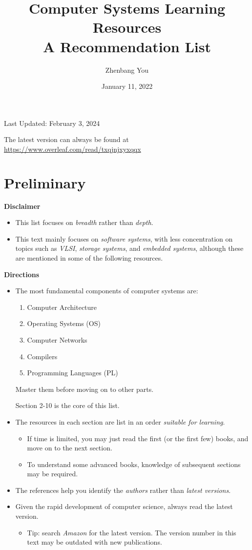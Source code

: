 \documentclass{article}
\title{\Huge{Computer Systems Learning Resources}\\ \huge{A Recommendation List}}
\author{Zhenbang You}
\date{January 11, 2022}
\begin{document}
\maketitle

\centerline{\large{Last Updated: February 3, 2024}}

\vspace{20pt}

The latest version can always be found at \href{https://www.overleaf.com/read/txqjnjxyxqqx}{https://www.overleaf.com/read/txqjnjxyxqqx}

\section{Preliminary}

\textbf{Disclaimer}
\begin{itemize}
    \item This list focuses on \emph{breadth} rather than \emph{depth}.
    \item This text mainly focuses on \emph{software systems}, with less concentration on topics such as \emph{VLSI}, \emph{storage systems}, and \emph{embedded systems}, although these are mentioned in some of the following resources.
\end{itemize}

\noindent
\textbf{Directions}
\begin{itemize}
    \item The most fundamental components of computer systems are:
    \begin{enumerate}
        \item Computer Architecture
        \item Operating Systems (OS)
        \item Computer Networks
        \item Compilers
        \item Programming Languages (PL)
    \end{enumerate}
    Master them before moving on to other parts.
    
    Section 2-10 is the core of this list.
    \item The resources in each section are list in an order \emph{suitable for learning}.
    \begin{itemize}
        \item If time is limited, you may just read the first (or the first few) books, and move on to the next section.
        \item To understand some advanced books, knowledge of subsequent sections may be required.
    \end{itemize}
    \item The references help you identify the \emph{authors} rather than \emph{latest versions}.
    \item Given the rapid development of computer science, always read the latest version.
    \begin{itemize}
        \item Tip: search \emph{Amazon} for the latest version. The version number in this text may be outdated with new publications.
    \end{itemize}
\end{itemize}
\end{document}
